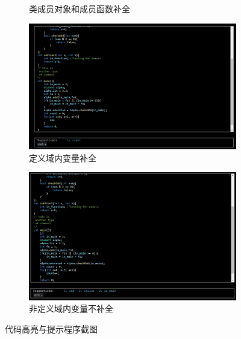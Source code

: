 \begin{figure}[h!]
\begin{subfigure}{0.45\linewidth}
        \caption{类成员对象和成员函数补全}
        \label{fig:2}
    \end{subfigure}
    \begin{subfigure}{0.45\textwidth}
        \centering
        \includegraphics[width=\linewidth]{imgs/定义域内变量补全.png}
        \caption{定义域内变量补全}
        \label{fig:3}
    \end{subfigure}
    \hspace{1em}
    \begin{subfigure}{0.45\linewidth}
        \centering
        \includegraphics[width=\linewidth]{imgs/非定义域内变量（in_function）不补全.png}
        \caption{非定义域内变量不补全}
        \label{fig:4}
    \end{subfigure}
    \caption{代码高亮与提示程序截图}
\end{figure}

